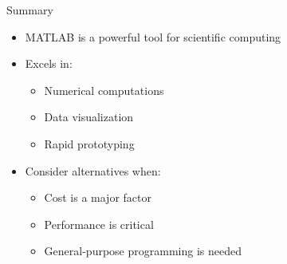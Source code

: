 \documentclass[10pt]{beamer}
\theoremstyle{plain}%
\theoremstyle{definition}
\theoremstyle{remark}
\begin{document}
\begin{frame}{Summary}
\begin{itemize}
    \item MATLAB is a powerful tool for scientific computing
    \item Excels in:
        \begin{itemize}
            \item Numerical computations
            \item Data visualization
            \item Rapid prototyping
        \end{itemize}
    \item Consider alternatives when:
        \begin{itemize}
            \item Cost is a major factor
            \item Performance is critical
            \item General-purpose programming is needed
        \end{itemize}
\end{itemize}
\end{frame}
\end{document}
